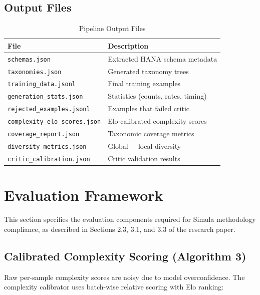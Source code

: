 \documentclass[11pt,a4paper]{article}
\begin{document}
\subsection{Output Files}

\begin{table}[H]
\centering
\caption{Pipeline Output Files}
\label{tab:outputs}
\begin{tabularx}{\textwidth}{lX}
\toprule
\textbf{File} & \textbf{Description} \\
\midrule
\texttt{schemas.json} & Extracted HANA schema metadata \\
\texttt{taxonomies.json} & Generated taxonomy trees \\
\texttt{training\_data.jsonl} & Final training examples \\
\texttt{generation\_stats.json} & Statistics (counts, rates, timing) \\
\texttt{rejected\_examples.jsonl} & Examples that failed critic \\
\texttt{complexity\_elo\_scores.json} & Elo-calibrated complexity scores \\
\texttt{coverage\_report.json} & Taxonomic coverage metrics \\
\texttt{diversity\_metrics.json} & Global + local diversity \\
\texttt{critic\_calibration.json} & Critic validation results \\
\bottomrule
\end{tabularx}
\end{table}

\newpage
\section{Evaluation Framework}
\label{chap:evaluation}

This section specifies the evaluation components required for Simula methodology
compliance, as described in Sections 2.3, 3.1, and 3.3 of the research paper.

\subsection{Calibrated Complexity Scoring (Algorithm 3)}

Raw per-sample complexity scores are noisy due to model overconfidence.
The complexity calibrator uses batch-wise relative scoring with Elo ranking:
\end{document}
